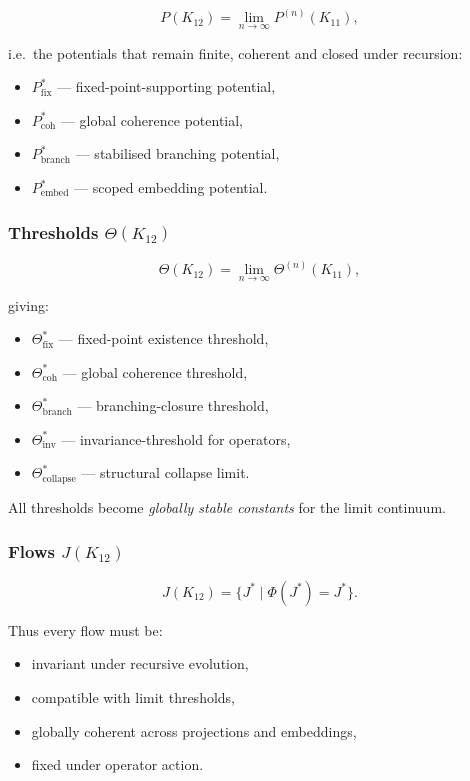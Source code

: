 \[
P(K_{12}) = \lim_{n\to\infty} P^{(n)}(K_{11}),
\]

i.e.\ the potentials that remain finite, coherent and closed under recursion:
\begin{itemize}
    \item $P_{\mathrm{fix}}^*$ — fixed-point-supporting potential,
    \item $P_{\mathrm{coh}}^*$ — global coherence potential,
    \item $P_{\mathrm{branch}}^*$ — stabilised branching potential,
    \item $P_{\mathrm{embed}}^*$ — scoped embedding potential.
\end{itemize}

\subsubsection{Thresholds $\Theta(K_{12})$}

\[
\Theta(K_{12}) =
\lim_{n\to\infty} \Theta^{(n)}(K_{11}),
\]

giving:
\begin{itemize}
    \item $\Theta^*_{\mathrm{fix}}$ — fixed-point existence threshold,
    \item $\Theta^*_{\mathrm{coh}}$ — global coherence threshold,
    \item $\Theta^*_{\mathrm{branch}}$ — branching-closure threshold,
    \item $\Theta^*_{\mathrm{inv}}$ — invariance-threshold for operators,
    \item $\Theta^*_{\mathrm{collapse}}$ — structural collapse limit.
\end{itemize}

All thresholds become \emph{globally stable constants} for the limit continuum.

\subsubsection{Flows $J(K_{12})$}

\[
J(K_{12}) = \{J^*\mid \Phi(J^*)=J^*\}.
\]

Thus every flow must be:
\begin{itemize}
    \item invariant under recursive evolution,
    \item compatible with limit thresholds,
    \item globally coherent across projections and embeddings,
    \item fixed under operator action.
\end{itemize}

